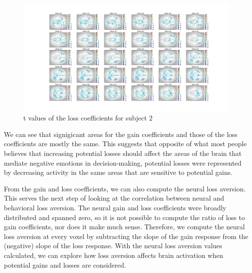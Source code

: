 \begin{figure}[H]
    \centering
        \includegraphics[scale=0.42]{figures/t_loss_standard_sub2.png}
    \caption{t values of the loss coefficients for subject 2}
\end{figure}

We can see that signigicant areas for the gain coefficients and those of the 
loss coefficients are mostly the same. This suggests that opposite of what 
most people believes that increasing potential losses should affect the areas 
of the brain that mediate negative emotions in decision-making, potential 
losses were represented by decreasing activity in the same areas that are 
sensitive to potential gains.

From the gain and loss coefficients, we can also compute the neural loss
aversion. This serves the next step of looking at the correlation between
neural and behavioral loss aversion. The neural gain and loss coefficients
were broadly distributed and spanned zero, so it is not possible to compute
the ratio of loss to gain coefficients, nor does it make much sense.
Therefore, we compute the neural loss aversion at every voxel by subtracting
the slope of the gain response from the (negative) slope of the loss response.
With the neural loss aversion values calculated, we can explore how loss
aversion affects brain activation when potential gains and losses are
considered.


